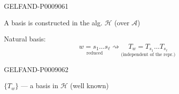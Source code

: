\begin{GelfandAdjacentEvidence}{GELFAND-P000906}{1}

A basis is constructed in the alg. $\mathcal H$ (over $\mathcal A$)

Natural basis:
\begin{equation*}
\underset{\text{reduced}}{w=s_1\ldots s_\ell}
\rightsquigarrow
\underset{\text{(independent of the repr.)}}{T_w=T_{s_1}\ldots T_{s_\ell}}
\tag{6}
\end{equation*}
\end{GelfandAdjacentEvidence}
\begin{GelfandAdjacentEvidence}{GELFAND-P000906}{2}


$\{T_w\}$ --- a basis in $\mathcal H$ (well known)

\end{GelfandAdjacentEvidence}
